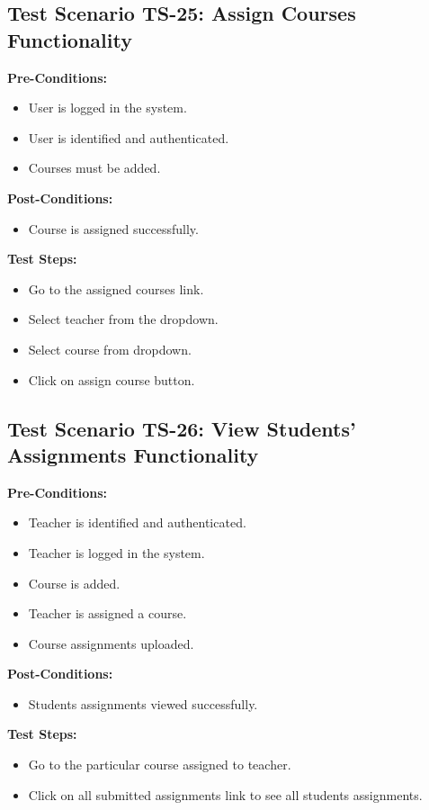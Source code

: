 \subsection{Test Scenario TS-25: Assign Courses Functionality}
\textbf{Pre-Conditions: }
\begin{itemize}

\item User is logged in the system.
\item User is identified and authenticated.
\item Courses must be added.

\end{itemize}

\textbf{Post-Conditions: }
\begin{itemize}
\item Course is assigned successfully.

\end{itemize}
\textbf{Test Steps:}
\begin{itemize}

\item Go to the assigned courses link.
\item Select teacher from the dropdown.
\item Select course from dropdown.
\item Click on assign course button.

\end{itemize}



\subsection{Test Scenario TS-26: View Students' Assignments Functionality}
\textbf{Pre-Conditions: }
\begin{itemize}

\item Teacher is identified and authenticated.
\item Teacher is logged in the system.
\item Course is added.
\item Teacher is assigned a course.
\item Course assignments uploaded.

\end{itemize}

\textbf{Post-Conditions: }
\begin{itemize}
\item Students assignments viewed successfully.

\end{itemize}
\textbf{Test Steps:}
\begin{itemize}

\item Go to the particular course assigned to teacher.
\item Click on all submitted assignments link to see all students assignments.

\end{itemize}


